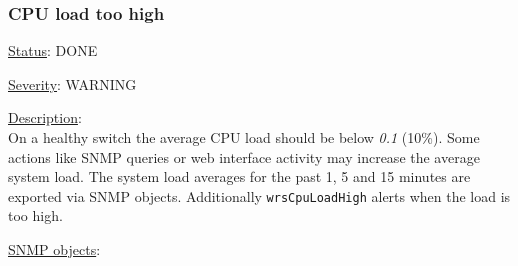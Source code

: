 \subsubsection{\bf CPU load too high}
		\label{fail:other:cpu}
		\begin{pck_descr}
			\item [] \underline{Status}: DONE
			\item [] \underline{Severity}: WARNING
			\item [] \underline{Description}:\\
        On a healthy switch the average CPU load should be below \emph{0.1} (10\%).
				Some actions like SNMP queries or web interface activity may increase
				the average system load. The system load averages for the past 1, 5 and
				15 minutes are exported via SNMP objects. Additionally
				\texttt{wrsCpuLoadHigh} alerts when the load is too high.
			\item [] \underline{SNMP objects}:\\
        {\footnotesize
        \\
				\\
				\\
				\\
				\\
         }
		\end{pck_descr}

